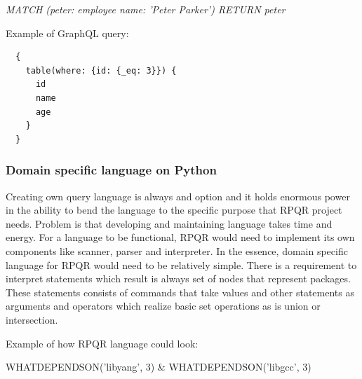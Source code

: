 \textit{MATCH (peter: employee {name: 'Peter Parker'}) RETURN peter}

Example of GraphQL query:

\begin{lstlisting}
  {
    table(where: {id: {_eq: 3}}) {
      id
      name
      age
    }
  }
\end{lstlisting}

\subsubsection*{Domain specific language on Python}
Creating own query language is always and option and it holds enormous power in the ability to
bend the language to the specific purpose that RPQR project needs. Problem is that developing
and maintaining language takes time and energy. For a language to be functional, RPQR would
need to implement its own components like scanner, parser and interpreter. In the essence,
domain specific language for RPQR would need to be relatively simple. There is a requirement
to interpret statements which result is always set of nodes that represent packages. These
statements consists of commands that take values and other statements as arguments and operators
which realize basic set operations as is union or intersection.

Example of how RPQR language could look:

WHATDEPENDSON('libyang', 3) \& WHATDEPENDSON('libgcc', 3)

\newpage

